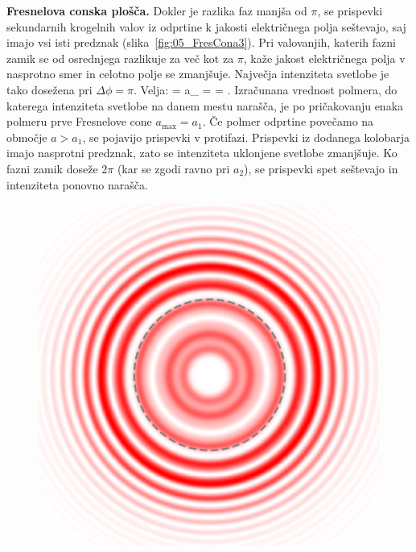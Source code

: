 \begin{example}{\bf Fresnelova conska plošča.}
Dokler je razlika faz manjša od $\pi$, se prispevki sekundarnih krogelnih valov iz odprtine k jakosti
električnega polja seštevajo, saj imajo vsi isti predznak (slika~\ref{fig:05_FresCona3}). Pri valovanjih,
katerih fazni zamik se od osrednjega razlikuje za več kot za $\pi$, kaže jakost električnega polja
v nasprotno smer in celotno polje se zmanjšuje. Največja intenziteta svetlobe je tako dosežena pri 
$\Delta \phi = \pi$. Velja:
\beq
{} = \pi \qquad {} \qquad a_ = 
 = . 
\label{eq:05_87c}
\eeq
Izračunana vrednost polmera, do katerega intenziteta svetlobe na danem mestu narašča, je po pričakovanju enaka 
polmeru prve Fresnelove cone $a_\mathrm{max} = a_1$.  
Če polmer odprtine povečamo na območje $a>a_1$, 
se pojavijo prispevki v protifazi. Prispevki iz dodanega kolobarja imajo nasprotni predznak, zato se 
intenziteta uklonjene svetlobe zmanjšuje. Ko fazni zamik doseže $2\pi$ (kar se zgodi
ravno pri $a_2$), se prispevki spet seštevajo in intenziteta ponovno narašča. 
 \begin{figure}[ht]
\centering
\includegraphics[width=40truemm]{slike/05_Fresnel_circ_k11_r1.png}\qquad

\end{figure}
\end{example}
